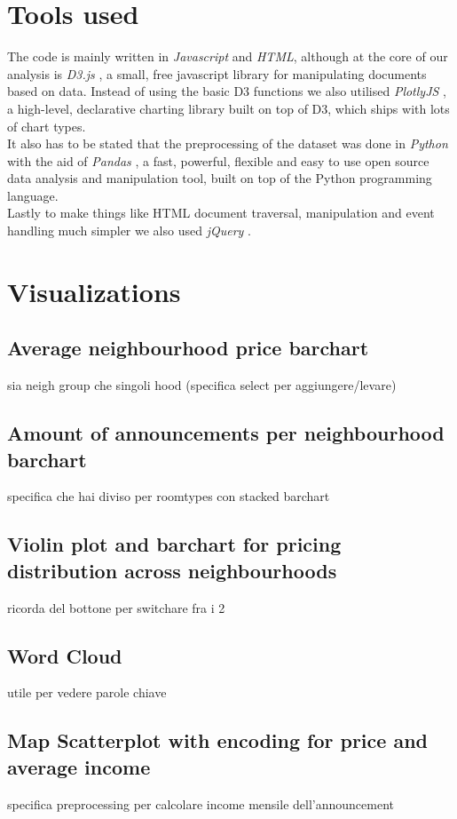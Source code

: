 \documentclass[11pt]{article}
\begin{document}
\section{Tools used}
The code is mainly written in {\em Javascript} and {\em HTML}, although at the core of our analysis is {\em D3.js} \cite{D3}, a small, free javascript library for manipulating documents based on data. Instead of using the basic D3 functions we also utilised {\em PlotlyJS} \cite{PLOTLY}, a high-level, declarative charting library built on top of D3, which ships with lots of chart types.\\
It also has to be stated that the preprocessing of the dataset was done in {\em Python} \cite{PYTHON} with the aid of {\em Pandas} \cite{PANDAS}, a fast, powerful, flexible and easy to use open source data analysis and manipulation tool, built on top of the Python programming language.\\
Lastly to make things like HTML document traversal, manipulation and event handling much simpler we also used {\em jQuery} \cite{JQUERY} .

\section{Visualizations}
\subsection{Average neighbourhood price barchart}
sia neigh group che singoli hood (specifica select per aggiungere/levare)
\subsection{Amount of announcements per neighbourhood barchart}
specifica che hai diviso per roomtypes con stacked barchart
\subsection{Violin plot and barchart for pricing distribution across neighbourhoods}
ricorda del bottone per switchare fra i 2
\subsection{Word Cloud}
utile per vedere parole chiave
\subsection{Map Scatterplot with encoding for price and average income}
specifica preprocessing per calcolare income mensile dell'announcement
\end{document}
